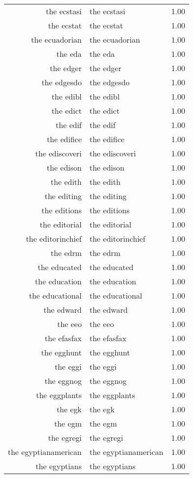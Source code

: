 \begin{table}[ht]
\begin{tabular}{rlr}
  the ecstasi & the ecstasi & 1.00 \\ 
  the ecstat & the ecstat & 1.00 \\ 
  the ecuadorian & the ecuadorian & 1.00 \\ 
  the eda & the eda & 1.00 \\ 
  the edger & the edger & 1.00 \\ 
  the edgesdo & the edgesdo & 1.00 \\ 
  the edibl & the edibl & 1.00 \\ 
  the edict & the edict & 1.00 \\ 
  the edif & the edif & 1.00 \\ 
  the edifice & the edifice & 1.00 \\ 
  the ediscoveri & the ediscoveri & 1.00 \\ 
  the edison & the edison & 1.00 \\ 
  the edith & the edith & 1.00 \\ 
  the editing & the editing & 1.00 \\ 
  the editions & the editions & 1.00 \\ 
  the editorial & the editorial & 1.00 \\ 
  the editorinchief & the editorinchief & 1.00 \\ 
  the edrm & the edrm & 1.00 \\ 
  the educated & the educated & 1.00 \\ 
  the education & the education & 1.00 \\ 
  the educational & the educational & 1.00 \\ 
  the edward & the edward & 1.00 \\ 
  the eeo & the eeo & 1.00 \\ 
  the efasfax & the efasfax & 1.00 \\ 
  the egghunt & the egghunt & 1.00 \\ 
  the eggi & the eggi & 1.00 \\ 
  the eggnog & the eggnog & 1.00 \\ 
  the eggplants & the eggplants & 1.00 \\ 
  the egk & the egk & 1.00 \\ 
  the egm & the egm & 1.00 \\ 
  the egregi & the egregi & 1.00 \\ 
  the egyptianamerican & the egyptianamerican & 1.00 \\ 
  the egyptians & the egyptians & 1.00 \\ 

\end{tabular}
\end{table}
